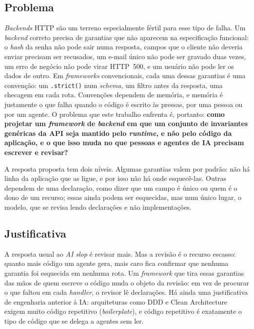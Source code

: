 \documentclass[a4paper,12pt]{article}
\newcommand{\estr}[1]{\textit{#1}}
\begin{document}
\subsection{Problema}\label{sec:problema}

\estr{Backends} HTTP são um terreno especialmente fértil para esse tipo de falha. Um \estr{backend} correto precisa de garantias que não aparecem na especificação funcional: o \estr{hash} da senha não pode sair numa resposta, campos que o cliente não deveria enviar precisam ser recusados, um e-mail único não pode ser gravado duas vezes, um erro de negócio não pode virar HTTP~500, e um usuário não pode ler os dados de outro. Em \estr{frameworks} convencionais, cada uma dessas garantias é uma convenção: um \texttt{.strict()} num \estr{schema}, um filtro antes da resposta, uma checagem em cada rota. Convenções dependem de memória, e memória é justamente o que falha quando o código é escrito às pressas, por uma pessoa ou por um agente. O problema que este trabalho enfrenta é, portanto: \textbf{como projetar um \estr{framework} de \estr{backend} em que um conjunto de invariantes genéricas da API seja mantido pelo \estr{runtime}, e não pelo código da aplicação, e o que isso muda no que pessoas e agentes de IA precisam escrever e revisar?}

A resposta proposta tem dois níveis. Algumas garantias valem por padrão: não há linha da aplicação que as ligue, e por isso não há onde esquecê-las. Outras dependem de uma declaração, como dizer que um campo é único ou quem é o dono de um recurso; essas ainda podem ser esquecidas, mas num único lugar, o modelo, que se revisa lendo declarações e não implementações.

\subsection{Justificativa}\label{sec:justificativa}

A resposta usual ao \estr{AI slop} é revisar mais. Mas a revisão é o recurso escasso: quanto mais código um agente gera, mais caro fica confirmar que nenhuma garantia foi esquecida em nenhuma rota. Um \estr{framework} que tira essas garantias das mãos de quem escreve o código muda o objeto da revisão: em vez de procurar o que faltou em cada \estr{handler}, o revisor lê declarações. Há ainda uma justificativa de engenharia anterior à IA: arquiteturas como DDD e Clean Architecture exigem muito código repetitivo (\estr{boilerplate}), e código repetitivo é exatamente o tipo de código que se delega a agentes sem ler.
\end{document}
